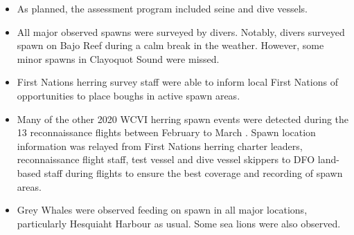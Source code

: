\begin{itemize}

\item As planned, the assessment program included seine and dive vessels.

\item All major observed spawns were surveyed by divers.
Notably, divers surveyed spawn on Bajo Reef during a calm break in the weather.
However, some minor spawns in Clayoquot Sound were missed.

\item First Nations herring survey staff were able to inform local First Nations of opportunities to place boughs in active spawn areas.

\item Many of the other 2020 WCVI herring spawn events were detected during the 13 reconnaissance flights between February  to March .
Spawn location information was relayed from First Nations herring charter leaders, reconnaissance flight staff, test vessel and dive vessel skippers to DFO land-based staff during flights to ensure the best coverage and recording of spawn areas.

\item Grey Whales were observed feeding on spawn in all major locations, particularly Hesquiaht Harbour as usual.
Some sea lions were also observed.

\end{itemize}
